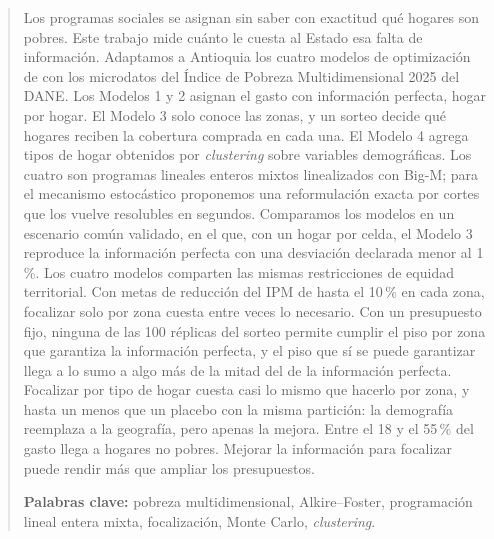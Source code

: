 \begin{abstract}
Los programas sociales se asignan sin saber con exactitud qué hogares son
pobres. Este trabajo mide cuánto le cuesta al Estado esa falta de información.
Adaptamos a Antioquia los cuatro modelos de optimización de
\citet{hamie2024} con los microdatos del Índice de Pobreza Multidimensional
2025 del DANE. Los Modelos 1 y 2 asignan el gasto con información perfecta,
hogar por hogar. El Modelo 3 solo conoce las zonas, y un sorteo decide qué
hogares reciben la cobertura comprada en cada una. El Modelo 4 agrega tipos de
hogar obtenidos por \emph{clustering} sobre variables demográficas.
Los cuatro son programas lineales enteros mixtos linealizados con Big-M; para el
mecanismo estocástico proponemos una reformulación exacta por cortes que los
vuelve resolubles en segundos. Comparamos los modelos en un escenario común
validado, en el que, con un hogar por celda, el Modelo 3 reproduce la
información perfecta con una desviación declarada menor al 1\,\%. Los cuatro modelos comparten las mismas restricciones de equidad territorial.
Con metas de reducción del IPM de hasta el 10\,\% en cada zona, focalizar solo
por zona cuesta entre \zMtresIPbaja{} veces lo necesario. Con un presupuesto
fijo, ninguna de las 100 réplicas del sorteo permite cumplir el piso por zona que garantiza la
información perfecta, y el piso que sí se puede garantizar llega a lo sumo a
algo más de la mitad del de la información perfecta. Focalizar por tipo de hogar
cuesta casi lo mismo que hacerlo por zona, y hasta un \zPlacMax{} menos que un placebo
con la misma partición: la demografía reemplaza a la geografía, pero apenas la
mejora. Entre el 18 y el 55\,\% del gasto llega a hogares no pobres. Mejorar la información para focalizar puede rendir más que ampliar los
presupuestos.

\medskip\noindent\textbf{Palabras clave:} pobreza multidimensional, Alkire--Foster,
programación lineal entera mixta, focalización, Monte Carlo, \emph{clustering}.
\end{abstract}

